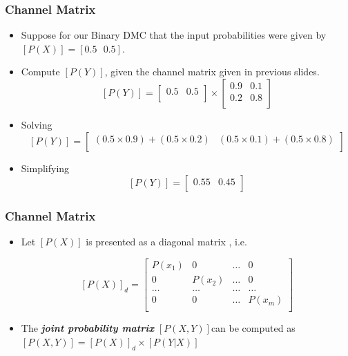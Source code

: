 \documentclass[a4]{beamer}
\begin{document}
\begin{frame}
\frametitle{Channel Matrix}
\begin{itemize}
\item Suppose for our Binary DMC that the input probabilities were given by $[P(X)] = [ 0.5\mbox{   }0.5]$.
\item Compute $[P(Y)]$, given the channel matrix given in previous slides.
\[  [P(Y)]  =  \left[ \begin{array}{cc}
0.5 & 0.5 \\
\end{array} \right] \times \left[ \begin{array}{cc}
0.9 & 0.1  \\
0.2 & 0.8 \\
\end{array} \right] \]

\item Solving
\[  [P(Y)]  =  \left[ \begin{array}{cc}
(0.5 \times 0.9)+(0.5 \times 0.2) & (0.5 \times 0.1)+(0.5 \times 0.8) \\
\end{array} \right]  \]

\item Simplifying \[  [P(Y)]  =  \left[ \begin{array}{cc}
0.55 & 0.45 \\
\end{array} \right]  \]
\end{itemize}
\end{frame}


\begin{frame}
\frametitle{Channel Matrix}
\begin{itemize}
\item Let $[P(X)]$ is presented as a diagonal matrix , i.e.

\[  [P(X)]_d  = \left[ \begin{array}{cccc}
P(x_1) &0 & \ldots & 0 \\
0 & P(x_2)& \ldots & 0 \\
\ldots & \ldots & \ldots & \ldots \\
0& 0 & \ldots & P(x_m) \\
\end{array} \right] \]
\item The \emph{\textbf{ joint probability matrix}} $[P(X,Y)]$can be computed as
$[P(X,Y)]  = [P(X)]_d\times [P(Y|X)]$
\end{itemize}
\end{frame}
\end{document}

